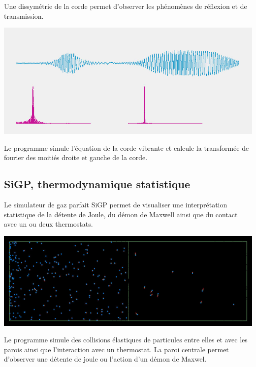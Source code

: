 Une dissymétrie de la corde permet d'observer les phénomènes de réflexion et de transmission.

\begin{center}
\includegraphics[scale=0.51]{./titre/heisenberg2}
\end{center}
%
Le programme simule l'équation de la corde vibrante et calcule la transformée de fourier des moitiés droite et gauche de la corde.

%
\subsection{SiGP, thermodynamique statistique}
%
Le simulateur de gaz parfait SiGP permet de visualiser une interprétation statistique de la détente de Joule, du démon de Maxwell ainsi que du contact avec un ou deux thermostats.
%
\begin{center}
\includegraphics[scale=0.41]{./titre/SiGP}
\end{center}
%
Le programme simule des collisions élastiques de particules entre elles et avec les parois ainsi que l'interaction avec un thermostat.
%
La paroi centrale permet d'observer une détente de joule ou l'action d'un démon de Maxwel.
%
